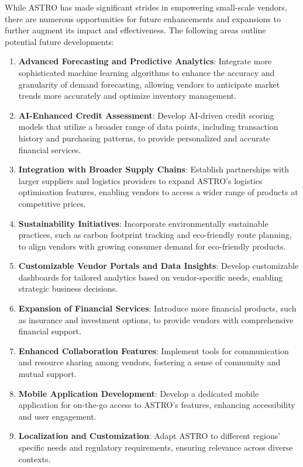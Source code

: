 While ASTRO has made significant strides in empowering small-scale vendors, there are numerous opportunities for future enhancements and expansions to further augment its impact and effectiveness. The following areas outline potential future developments:

\begin{enumerate}
    \item \textbf{Advanced Forecasting and Predictive Analytics}: Integrate more sophisticated machine learning algorithms to enhance the accuracy and granularity of demand forecasting, allowing vendors to anticipate market trends more accurately and optimize inventory management.
    \item \textbf{AI-Enhanced Credit Assessment}: Develop AI-driven credit scoring models that utilize a broader range of data points, including transaction history and purchasing patterns, to provide personalized and accurate financial services.
    \item \textbf{Integration with Broader Supply Chains}: Establish partnerships with larger suppliers and logistics providers to expand ASTRO’s logistics optimisation features, enabling vendors to access a wider range of products at competitive prices.
    \item \textbf{Sustainability Initiatives}: Incorporate environmentally sustainable practices, such as carbon footprint tracking and eco-friendly route planning, to align vendors with growing consumer demand for eco-friendly products.
    \item \textbf{Customizable Vendor Portals and Data Insights}: Develop customizable dashboards for tailored analytics based on vendor-specific needs, enabling strategic business decisions.
    \item \textbf{Expansion of Financial Services}: Introduce more financial products, such as insurance and investment options, to provide vendors with comprehensive financial support.
    \item \textbf{Enhanced Collaboration Features}: Implement tools for communication and resource sharing among vendors, fostering a sense of community and mutual support.
    \item \textbf{Mobile Application Development}: Develop a dedicated mobile application for on-the-go access to ASTRO’s features, enhancing accessibility and user engagement.
    \item \textbf{Localization and Customization}: Adapt ASTRO to different regions’ specific needs and regulatory requirements, ensuring relevance across diverse contexts.

\end{enumerate}
